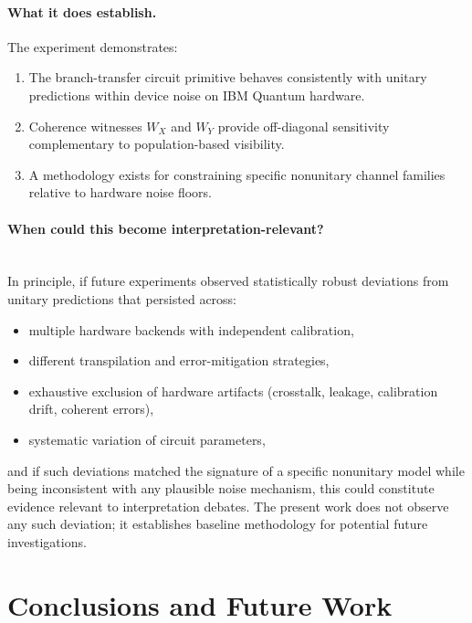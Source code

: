 \documentclass[11pt]{article}
\begin{document}
\paragraph{What it does establish.}
The experiment demonstrates:
\begin{enumerate}
    \item The branch-transfer circuit primitive behaves consistently with unitary predictions within device noise on IBM Quantum hardware.
    \item Coherence witnesses $W_X$ and $W_Y$ provide off-diagonal sensitivity complementary to population-based visibility.
    \item A methodology exists for constraining specific nonunitary channel families relative to hardware noise floors.
\end{enumerate}

\vspace{8pt}

\paragraph{When could this become interpretation-relevant?}\mbox{}\\[0.6\baselineskip]
In principle, if future experiments observed statistically robust deviations from unitary predictions that persisted across:

\begin{itemize}
    \item multiple hardware backends with independent calibration,
    \item different transpilation and error-mitigation strategies,
    \item exhaustive exclusion of hardware artifacts (crosstalk, leakage, calibration drift, coherent errors),
    \item systematic variation of circuit parameters,
\end{itemize}
and if such deviations matched the signature of a specific nonunitary model while being inconsistent with any plausible noise mechanism, this could constitute evidence relevant to interpretation debates. The present work does not observe any such deviation; it establishes baseline methodology for potential future investigations.

\section{Conclusions and Future Work}
\label{sec:conclusion}
\end{document}
